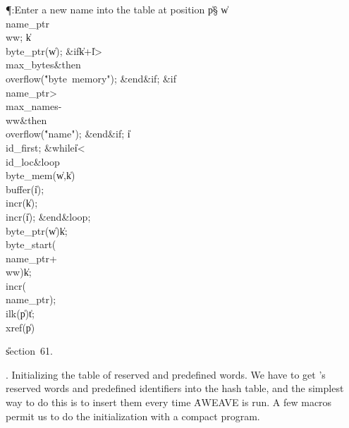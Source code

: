 \Y\P\?\4:Enter a new name into the table at position \|p\X\S\?\6
\|w\?\K\?\\{name\_ptr}\?\?\\{ww};\5
\|k\?\K\?\\{byte\_ptr}\?\1(\?\|w\?\2)\?;\6
\&{if}\1\1\8\|k\?+\?\|l\?>\?\\{max\_bytes}\2\8\&{then}\6
\\{overflow}\?\1(\?\.{"byte\ memory"}\?\2)\?;\2\6
\&{end}\8\2\&{if}\1;\6
\&{if}\1\1\8\\{name\_ptr}\?>\?\\{max\_names}\?-\?\\{ww}\2\8\&{then}\6
\\{overflow}\?\1(\?\.{"name"}\?\2)\?;\2\6
\&{end}\8\2\&{if}\1;\6
\|i\?\K\?\\{id\_first};\6
\1\&{while}\8\|i\?<\?\\{id\_loc}\8\&{loop}\6
\\{byte\_mem}\?\1(\?\|w\?,\?\|k\?\2)\K\?\\{buffer}\?\1(\?\|i\?\2)\?;\5
\\{incr}\?\1(\?\|k\?\2)\?;\5
\\{incr}\?\1(\?\|i\?\2)\?;\2\6
\&{end}\8\&{loop};\6
\\{byte\_ptr}\?\1(\?\|w\?\2)\K\?\|k;\5
\\{byte\_start}\?\1(\?\\{name\_ptr}\?+\?\\{ww}\?\2)\K\?\|k;\5
\\{incr}\?\1(\?\\{name\_ptr}\?\2)\?;\5
\\{ilk}\?\1(\?\|p\?\2)\K\?\|t;\5
\\{xref}\?\1(\?\|p\?\2)\K{}\par
\U section~61.\fi

.  Initializing the table of reserved and predefined words.
We have to get \ADA's reserved words and predefined identifiers into the
hash table, and the
simplest way to do this is to insert them every time \.{AWEAVE} is run.
A few macros permit us to do the initialization with a compact program.

